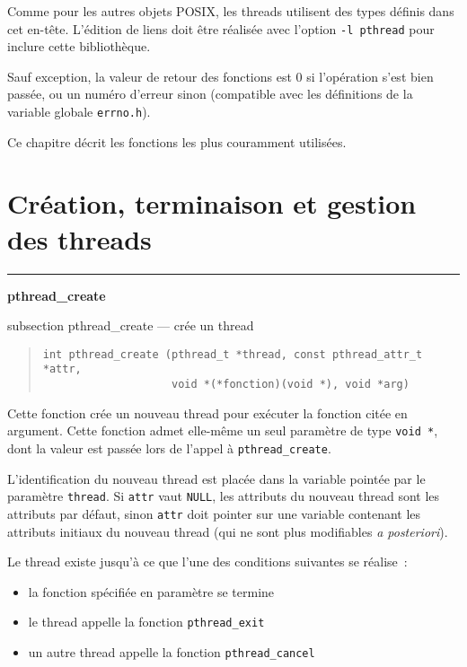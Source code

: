 \documentclass [twoside] {report}
\newcommand {\primitive} [1]
    {
	\phantomsection
	{\large \bf #1}
	\addcontentsline {toc} {subsection} {#1}
    }
\newcommand {\separation}
    {
	\vspace {5mm}
	\nopagebreak
	\hrule
    }
\begin{document}
Comme pour les autres objets POSIX, les threads utilisent des types
définis dans cet en-tête. L'édition de liens doit être réalisée avec
l'option \verb|-l pthread| pour inclure cette bibliothèque.

Sauf exception, la valeur de retour des fonctions est 0 si l'opération
s'est bien passée, ou un numéro d'erreur sinon (compatible avec les
définitions de la variable globale \texttt {errno.h}).

Ce chapitre décrit les fonctions les plus couramment utilisées.


\section {Création, terminaison et gestion des threads}

\separation 
\primitive {pthread\_create} --- crée un thread

\begin {quote}
\begin {verbatim}
int pthread_create (pthread_t *thread, const pthread_attr_t *attr,
                    void *(*fonction)(void *), void *arg)
\end{verbatim}
\end {quote}

Cette fonction crée un nouveau thread pour exécuter la fonction
citée en argument. Cette fonction admet elle-même un seul paramètre
de type \verb|void *|, dont la valeur est passée lors de l'appel à
\verb|pthread_create|.

L'identification du nouveau thread est placée dans la variable pointée
par le paramètre \texttt {thread}. Si \texttt {attr} vaut \texttt {NULL},
les attributs du nouveau thread sont les attributs par défaut, sinon
\texttt {attr} doit pointer sur une variable contenant les attributs
initiaux du nouveau thread (qui ne sont plus modifiables \textit {a
posteriori}).

Le thread existe jusqu'à ce que l'une des conditions suivantes se
réalise~:

\begin {itemize}
    \item la fonction spécifiée en paramètre se termine
    \item le thread appelle la fonction \texttt {pthread\_exit}
    \item un autre thread appelle la fonction \texttt {pthread\_cancel}
\end {itemize}
\end{document}
